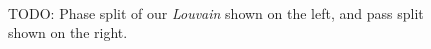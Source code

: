 \begin{figure}[hbtp]
  \centering
   \\[-2ex]
  \caption{TODO: Phase split of our \textit{Louvain} shown on the left, and pass split shown on the right.}
  \label{fig:louvainrak-hashtable}
\end{figure}
